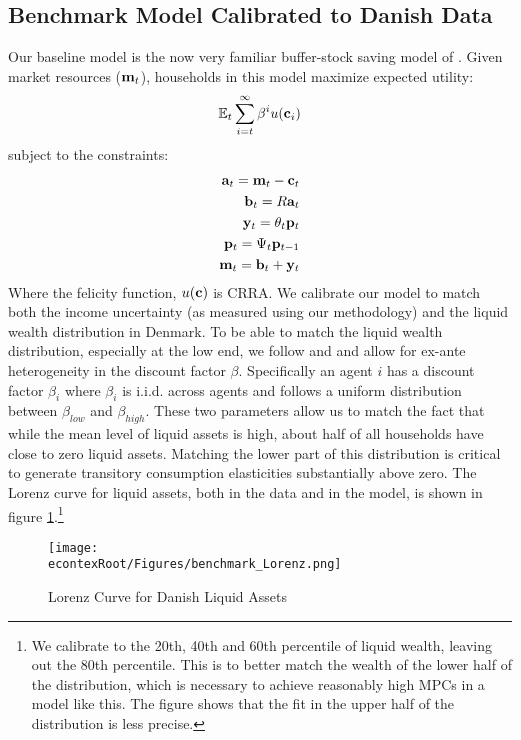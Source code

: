 \documentclass[titlepage]{\econtex}\newcommand{\texname}{ConsumptionHeterogeneity}
\begin{document}
\subsection{Benchmark Model Calibrated to Danish Data} \label{benchmark_model}
Our baseline model is the now very familiar buffer-stock saving model of \cite{carroll_buffer_1997}. Given market resources ($\boldmath{\ensuremath{\mathbf{m}}}_t$), households in this model maximize expected utility:
\begin{align*}
	\mathbb{E}_t \sum_{i=t}^{\infty} \beta^i u(\mathbf{c}_i)
\end{align*}
subject to the constraints:
\begin{align*}
	\mathbf{a}_t = \mathbf{m}_t - \mathbf{c}_t \\
	\mathbf{b}_t = R\mathbf{a}_t \\
	\mathbf{y}_t = \theta_t \mathbf{p}_t \\
	\mathbf{p}_t = \Psi_t \mathbf{p}_{t-1} \\
	\mathbf{m}_t = \mathbf{b}_t + \mathbf{y}_t
\end{align*}
Where the felicity function, $u(\mathbf{c})$ is CRRA. We calibrate our model to match both the income uncertainty (as measured using our methodology) and the liquid wealth distribution in Denmark. To be able to match the liquid wealth distribution, especially at the low end, we follow \cite{krusell_income_1998} and \cite{carroll_distribution_2017} and allow for ex-ante heterogeneity in the discount factor $\beta$. Specifically an agent $i$ has a discount factor $\beta_i$ where $\beta_i$ is i.i.d. across agents and follows a uniform distribution between $\beta_{low}$ and $\beta_{high}$. These two parameters allow us to match the fact that while the mean level of liquid assets is high, about half of all households have close to zero liquid assets. Matching the lower part of this distribution is critical to generate transitory consumption elasticities substantially above zero. The Lorenz curve for liquid assets, both in the data and in the model, is shown in figure \ref{fig:Lorenz}.\footnote{We calibrate to the 20th, 40th and 60th percentile of liquid wealth, leaving out the 80th percentile. This is to better match the wealth of the lower half of the distribution, which is necessary to achieve reasonably high MPCs in a model like this. The figure shows that the fit in the upper half of the distribution is less precise.}
\begin{figure} 
		\centering
		\texttt{[image: \\econtexRoot/Figures/benchmark\_Lorenz.png]}
		\caption{Lorenz Curve for Danish Liquid Assets}
		\label{fig:Lorenz}
\end{figure}
\end{document}

